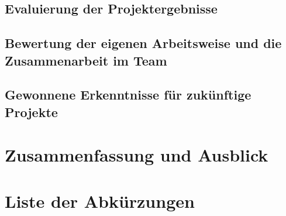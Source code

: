 \documentclass[a4paper,11pt,DIV=12,overfullrule=on]{scrreprt}%
\begin{document}
\section{Evaluierung der Projektergebnisse}
\section{Bewertung der eigenen Arbeitsweise und die Zusammenarbeit im Team}
\section{Gewonnene Erkenntnisse für zukünftige Projekte}

\chapter{Zusammenfassung und Ausblick}

\chapter*{Liste der Abkürzungen}
\begin{acronym}
\end{acronym}

\lstlistoflistings
\end{document}

